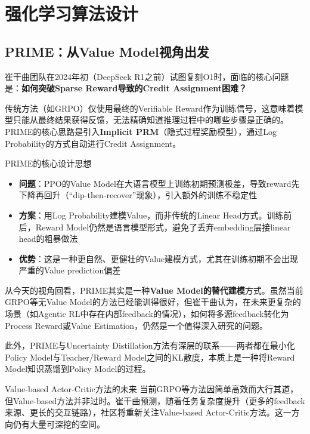 \documentclass[a4paper]{article}
\begin{document}
\section{强化学习算法设计}

\subsection{PRIME：从Value Model视角出发}

崔干曲团队在2024年初（DeepSeek R1之前）试图复刻O1时，面临的核心问题是：\textbf{如何突破Sparse Reward导致的Credit Assignment困难？}

传统方法（如GRPO）仅使用最终的Verifiable Reward作为训练信号，这意味着模型只能从最终结果获得反馈，无法精确知道推理过程中的哪些步骤是正确的。PRIME的核心思路是引入\textbf{Implicit PRM}（隐式过程奖励模型），通过Log Probability的方式自动进行Credit Assignment。

\begin{importantbox}{PRIME的核心设计思想}
\begin{itemize}
    \item \textbf{问题}：PPO的Value Model在大语言模型上训练初期预测极差，导致reward先下降再回升（``dip-then-recover''现象），引入额外的训练不稳定性
    \item \textbf{方案}：用Log Probability建模Value，而非传统的Linear Head方式。训练前后，Reward Model仍然是语言模型形式，避免了丢弃embedding层接linear head的粗暴做法
    \item \textbf{优势}：这是一种更自然、更健壮的Value建模方式，尤其在训练初期不会出现严重的Value prediction偏差
\end{itemize}
\end{importantbox}

从今天的视角回看，PRIME其实是一种\textbf{Value Model的替代建模}方式。虽然当前GRPO等无Value Model的方法已经能训得很好，但崔干曲认为，在未来更复杂的场景（如Agentic RL中存在内部feedback的情况），如何将多源feedback转化为Process Reward或Value Estimation，仍然是一个值得深入研究的问题。

此外，PRIME与Uncertainty Distillation方法有深层的联系——两者都在最小化Policy Model与Teacher/Reward Model之间的KL散度，本质上是一种将Reward Model知识蒸馏到Policy Model的过程。

\begin{knowledgebox}{Value-based Actor-Critic方法的未来}
当前GRPO等方法因简单高效而大行其道，但Value-based方法并非过时。崔干曲预测，随着任务复杂度提升（更多的feedback来源、更长的交互链路），社区将重新关注Value-based Actor-Critic方法。这一方向仍有大量可深挖的空间。
\end{knowledgebox}
\end{document}
